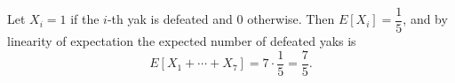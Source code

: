 Let $X_i=1$ if the $i$-th yak is defeated and $0$ otherwise. Then $E[X_i]=\dfrac{1}{5}$, and by linearity of expectation the expected number of defeated yaks is
\[E[X_1+\cdots+X_7]=7\cdot\dfrac{1}{5}=\boxed{\dfrac{7}{5}}.\]
